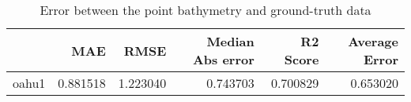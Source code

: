 \begin{table}[h!]
\caption{Error between the point bathymetry and ground-truth data}
\label{tab:oahu1_lidar_error}
\begin{tabular}{lrrrrr}
\toprule
 & MAE & RMSE & Median Abs error & R2 Score & Average Error \\
\midrule
oahu1 & 0.881518 & 1.223040 & 0.743703 & 0.700829 & 0.653020 \\
\bottomrule
\end{tabular}
\end{table}
